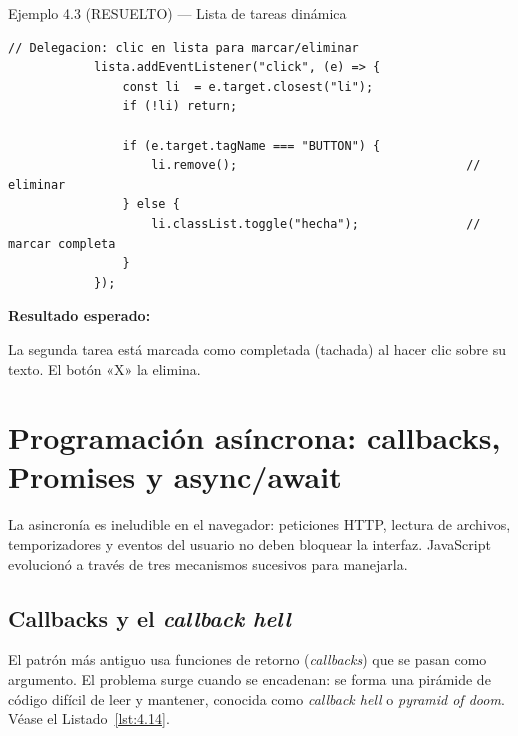 \documentclass[11pt,a4paper,openany]{book}
\begin{document}
\begin{cajaejemplo}{Ejemplo 4.3 (RESUELTO) — Lista de tareas dinámica}
\begin{lstlisting}[style=js,caption={tareas.js},label=lst:4.13js]
			// Delegacion: clic en lista para marcar/eliminar
			lista.addEventListener("click", (e) => {
				const li  = e.target.closest("li");
				if (!li) return;
				
				if (e.target.tagName === "BUTTON") {
					li.remove();                                // eliminar
				} else {
					li.classList.toggle("hecha");               // marcar completa
				}
			});
		\end{lstlisting}
		
		\textbf{Resultado esperado:}
		
		
		\medskip
		La segunda tarea está marcada como completada (tachada) al hacer
		clic sobre su texto. El botón «X» la elimina.
	\end{cajaejemplo}
	
	\section{Programación asíncrona: callbacks, Promises y async/await}
	\label{sec:4.async}
	
	La asincronía es ineludible en el navegador: peticiones HTTP,
	lectura de archivos, temporizadores y eventos del usuario no deben
	bloquear la interfaz. JavaScript evolucionó a través de tres
	mecanismos sucesivos para manejarla.
	
	\subsection{Callbacks y el \emph{callback hell}}
	\label{sub:4.callbacks}
	
	El patrón más antiguo usa funciones de retorno
	(\emph{callbacks}) que se pasan como argumento. El problema
	surge cuando se encadenan: se forma una pirámide de código
	difícil de leer y mantener, conocida como \emph{callback hell}
	o \emph{pyramid of doom}. Véase el Listado~\ref{lst:4.14}.
	
\end{document}

